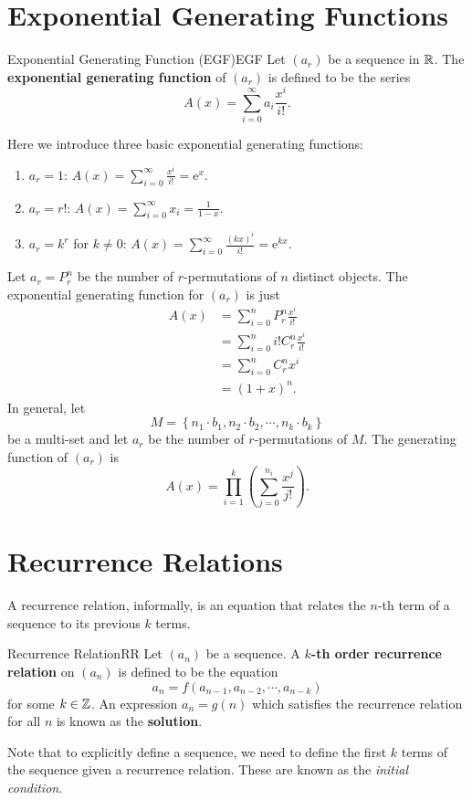 \documentclass[math]{amznotes}
\theoremstyle{remark}
\newcommand{\0}{\mathbf{0}}
\newcommand{\1}{\mathbf{1}}
\newcommand{\e}{\mathrm{e}}
\begin{document}
\section{Exponential Generating Functions}
\begin{dfnbox}{Exponential Generating Function (EGF)}{EGF}
    Let $(a_r)$ be a sequence in $\mathbb{R}$. The {\color{red} \textbf{exponential generating function}} of $(a_r)$ is defined to be the series
    \begin{equation*}
        A(x) = \sum_{i = 0}^{\infty}a_i\frac{x^i}{i!}.
    \end{equation*}
\end{dfnbox}
Here we introduce three basic exponential generating functions:
\begin{enumerate}
    \item $a_r = 1$: $A(x) = \sum_{i = 0}^{\infty}\frac{x^i}{i!} = \e^x$.
    \item $a_r = r!$: $A(x) = \sum_{i = 0}^{\infty}x_i = \frac{1}{1 - x}$.
    \item $a_r = k^r$ for $k \neq 0$: $A(x) = \sum_{i = 0}^{\infty}\frac{(kx)^i}{i!} = \e^{kx}$.
\end{enumerate}
Let $a_r = P^n_r$ be the number of $r$-permutations of $n$ distinct objects. The exponential generating function for $(a_r)$ is just 
\begin{align*}
    A(x) & = \sum_{i = 0}^{n}P^n_r\frac{x^i}{i!} \\
    & = \sum_{i = 0}^{n}i!C^n_r\frac{x^i}{i!} \\
    & = \sum_{i = 0}^{n}C^n_rx^i \\
    & = (1 + x)^n.
\end{align*}
In general, let 
\begin{equation*}
    M = \left\{n_1 \cdot b_1, n_2 \cdot b_2, \cdots, n_k \cdot b_k\right\}
\end{equation*}
be a multi-set and let $a_r$ be the number of $r$-permutations of $M$. The generating function of $(a_r)$ is
\begin{equation*}
    A(x) = \prod_{i = 1}^{k}\left(\sum_{j = 0}^{n_i}\frac{x^j}{j!}\right).
\end{equation*}
\section{Recurrence Relations}
A recurrence relation, informally, is an equation that relates the $n$-th term of a sequence to its previous $k$ terms.
\begin{dfnbox}{Recurrence Relation}{RR}
    Let $(a_n)$ be a sequence. A {\color{red} \textbf{$k$-th order recurrence relation}} on $(a_n)$ is defined to be the equation
    \begin{equation*}
        a_n = f(a_{n - 1}, a_{n - 2}, \cdots, a_{n - k})
    \end{equation*}
    for some $k \in \mathbb{Z}$. An expression $a_n = g(n)$ which satisfies the recurrence relation for all $n$ is known as the {\color{red} \textbf{solution}}. 
\end{dfnbox}
Note that to explicitly define a sequence, we need to define the first $k$ terms of the sequence given a recurrence relation. These are known as the \textit{initial condition}.
\end{document}
